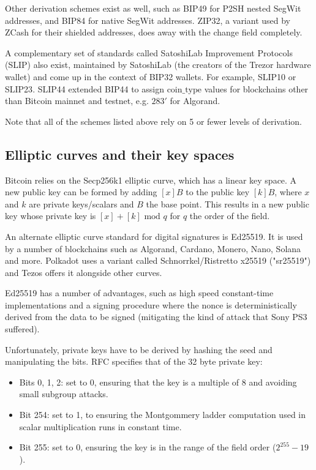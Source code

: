 \documentclass[12pt, a4paper, twocolumn]{article}
\begin{document}
Other derivation schemes exist as well, such as BIP49\cite{BIP49} for P2SH nested SegWit addresses, and BIP84\cite{BIP84} for native SegWit addresses. ZIP32\cite{ZIP32}, a variant used by ZCash for their shielded addresses, does away with the change field completely.

A complementary set of standards called SatoshiLab Improvement Protocols (SLIP) also exist, maintained by SatoshiLab (the creators of the Trezor hardware wallet) and come up in the context of BIP32 wallets. For example, SLIP10\cite{SLIP10} or SLIP23\cite{SLIP23}. SLIP44\cite{BIP44} extended BIP44 to assign $\text{coin\_type}$ values for blockchains other than Bitcoin mainnet and testnet, e.g. $\text{283}'$ for Algorand.

Note that all of the schemes listed above rely on 5 or fewer levels of derivation.

\subsection{Elliptic curves and their key spaces}
\label{subsec:elliptic_curves_and_their_key_spaces}

Bitcoin relies on the Secp256k1\cite{Secp256k1} elliptic curve, which has a linear key space. A new public key can be formed by adding $[x]B$ to the public key $[k]B$, where $x$ and $k$ are private keys/scalars and $B$ the base point. This results in a new public key whose private key is $[x] + [k] \text{ mod } q$ for $q$ the order of the field.

An alternate elliptic curve standard for digital signatures is Ed25519\cite{Ed25519}. It is used by a number of blockchains such as Algorand\cite{AlgorandEd25519}, Cardano\cite{CardanoEd25519}, Monero\cite{MoneroEd25519}, Nano\cite{NanoEd25519}, Solana\cite{SolanaEd25519} and more. Polkadot\cite{PolkadotEd25519} uses a variant called Schnorrkel/Ristretto x25519 ("sr25519") and Tezos\cite{TezosEd25519} offers it alongside other curves.

Ed25519 has a number of advantages, such as high speed constant-time implementations and a signing procedure where the nonce is deterministically derived from the data to be signed (mitigating the kind of attack that Sony PS3 suffered\cite{Ed25519}).

Unfortunately, private keys have to be derived by hashing the seed and manipulating the bits. RFC\cite{RFC8032} specifies that of the 32 byte private key:

\begin{itemize}[label=\textendash, itemsep=-0.5em]
  \item Bits 0, 1, 2:  set to 0, ensuring that the key is a multiple of 8 and avoiding small subgroup attacks.
  \item Bit 254: set to 1, to ensuring the Montgommery ladder computation used in scalar multiplication runs in constant time.
  \item Bit 255: set to 0, ensuring the key is in the range of the field order ($2^{255} - 19$).
\end{itemize}
\end{document}
